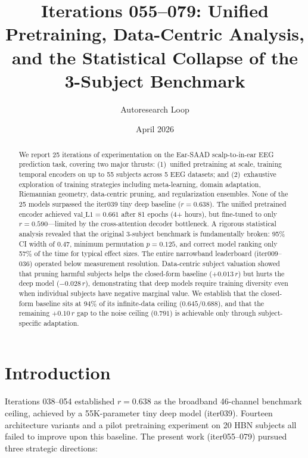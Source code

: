 \documentclass[11pt,a4paper]{article}
\title{Iterations 055--079: Unified Pretraining, Data-Centric Analysis,\\
  and the Statistical Collapse of the 3-Subject Benchmark}
\author{Autoresearch Loop}
\date{April 2026}
\begin{document}
\maketitle

\begin{abstract}
We report 25 iterations of experimentation on the Ear-SAAD
scalp-to-in-ear EEG prediction task, covering two major thrusts:
(1)~unified pretraining at scale, training temporal encoders on up to 55
subjects across 5 EEG datasets; and (2)~exhaustive exploration of
training strategies including meta-learning, domain adaptation, Riemannian
geometry, data-centric pruning, and regularization ensembles.
None of the 25 models surpassed the iter039 tiny deep baseline
($r = 0.638$). The unified pretrained encoder achieved
$\text{val\_L1} = 0.661$ after 81 epochs (4+ hours), but fine-tuned
to only $r = 0.590$---limited by the cross-attention decoder bottleneck.
A rigorous statistical analysis revealed that the original 3-subject
benchmark is fundamentally broken: 95\% CI width of 0.47, minimum
permutation $p = 0.125$, and correct model ranking only 57\% of the time
for typical effect sizes. The entire narrowband leaderboard (iter009--036)
operated below measurement resolution. Data-centric subject valuation
showed that pruning harmful subjects helps the closed-form baseline
($+0.013\,r$) but hurts the deep model ($-0.028\,r$), demonstrating that
deep models require training diversity even when individual subjects have
negative marginal value. We establish that the closed-form baseline sits at
94\% of its infinite-data ceiling ($0.645/0.688$), and that the remaining
$+0.10\,r$ gap to the noise ceiling ($0.791$) is achievable only through
subject-specific adaptation.
\end{abstract}

\tableofcontents
\newpage

\section{Introduction}

Iterations 038--054 established $r = 0.638$ as the broadband 46-channel
benchmark ceiling, achieved by a 55K-parameter tiny deep model (iter039).
Fourteen architecture variants and a pilot pretraining experiment on 20
HBN subjects all failed to improve upon this baseline. The present work
(iter055--079) pursued three strategic directions:
\end{document}
